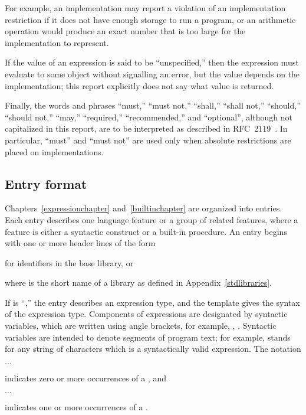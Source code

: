 \vest For example, an implementation may report a violation of an
implementation restriction if it does not have enough storage to run a
program,
or an arithmetic operation would produce an exact number that is
too large for the implementation to represent.

\vest If the value of an expression is said to be ``unspecified,'' then
the expression must evaluate to some object without signalling an error,
but the value depends on the implementation; this report explicitly does
not say what value is returned. 

Finally, the words and phrases ``must,'' ``must not,'' ``shall,''
``shall not,'' ``should,'' ``should not,'' ``may,'' ``required,''
``recommended,'' and ``optional'', although not capitalized in this
report, are to be interpreted as described in RFC~2119~\cite{rfc2119}.
In particular, ``must'' and ``must not'' are used only when
absolute restrictions are placed on implementations.



\subsection{Entry format}

Chapters~\ref{expressionchapter} and~\ref{builtinchapter} are organized
into entries.  Each entry describes one language feature or a group of
related features, where a feature is either a syntactic construct or a
built-in procedure.  An entry begins with one or more header lines of the form

\noindent{}\unpenalty

for identifiers in the base library, or

\noindent{}\unpenalty

where  is the short name of a library
as defined in Appendix~\ref{stdlibraries}.

If  is ``\exprtype,'' the entry describes an expression
type, and the template gives the syntax of the expression type.
Components of expressions are designated by syntactic variables, which
are written using angle brackets, for example, ,
.  Syntactic variables are intended to denote segments of
program text; for example,  stands for any string of
characters which is a syntactically valid expression.  The notation
\begin{tabbing}
\qquad {} $\ldots$
\end{tabbing}
indicates zero or more occurrences of a , and
\begin{tabbing}
\qquad {}  $\ldots$
\end{tabbing}
indicates one or more occurrences of a .

